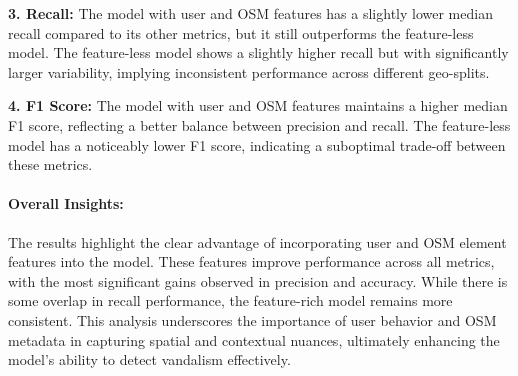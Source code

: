 \documentclass[
    13pt, %
    a4paper, %
    listof=totoc, %
    bibliography=totoc, %
    index=totoc, %
    headsepline
]{scrreprt}
\begin{document}
\textbf{3. Recall:} The model with user and OSM features has a slightly lower median recall compared to its other metrics, but it still outperforms the feature-less model. The feature-less model shows a slightly higher recall but with significantly larger variability, implying inconsistent performance across different geo-splits.

\textbf{4. F1 Score:} The model with user and OSM features maintains a higher median F1 score, reflecting a better balance between precision and recall. The feature-less model has a noticeably lower F1 score, indicating a suboptimal trade-off between these metrics.

\paragraph{Overall Insights:}
The results highlight the clear advantage of incorporating user and OSM element features into the model. These features improve performance across all metrics, with the most significant gains observed in precision and accuracy. While there is some overlap in recall performance, the feature-rich model remains more consistent. This analysis underscores the importance of user behavior and OSM metadata in capturing spatial and contextual nuances, ultimately enhancing the model's ability to detect vandalism effectively.
\end{document}
